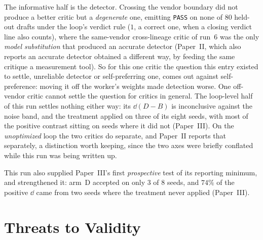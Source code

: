 \documentclass[11pt]{article}
\begin{document}
The informative half is the detector. Crossing the vendor boundary did not produce a better critic
but a \emph{degenerate} one, emitting \texttt{PASS} on none of $80$ held-out drafts under the
loop's verdict rule ($1$, a correct one, when a closing verdict line also counts), where the
same-vendor cross-lineage critic of run~6 was the only \emph{model substitution} that produced an
accurate detector (Paper~II, which also reports an accurate detector obtained a different way, by
feeding the same critique a measurement tool). So for this one critic the question this entry
existed to settle, unreliable detector or self-preferring one, comes out against self-preference:
moving it off the worker's weights made detection worse. One off-vendor critic cannot settle the
question for critics in general. The loop-level half of this run settles
nothing either way: its $\dd(D-B)$ is inconclusive against the noise band, and the treatment
applied on three of its eight seeds, with most of the positive contrast sitting on seeds where
it did not (Paper~III). On the \emph{unoptimized} loop the two critics do separate,
and Paper~II reports that separately, a distinction worth keeping, since the two axes were
briefly conflated while this run was being written up.

This run also supplied Paper~III's first \emph{prospective} test of its reporting
minimum, and strengthened it: arm~D accepted on only $3$ of $8$ seeds, and $74\%$ of the positive
$\dd$ came from two seeds where the treatment never applied (Paper~III).

\section{Threats to Validity}
\label{sec:threats}
\end{document}

